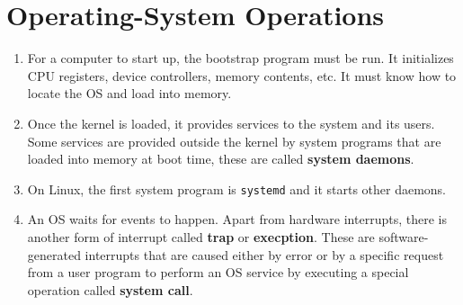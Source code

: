 \documentclass[journal,12pt,twocolumn]{IEEEtran}
\begin{document}
\section{Operating-System Operations}
\begin{enumerate}
  \item For a computer to start up, the bootstrap program must be run. It 
  initializes CPU registers, device controllers, memory contents, etc. It must 
  know how to locate the OS and load into memory.
  \item Once the kernel is loaded, it provides services to the system and its 
  users. Some services are provided outside the kernel by system programs that 
  are loaded into memory at boot time, these are called \textbf{system daemons}.
  \item On Linux, the first system program is \texttt{systemd} and it starts 
  other daemons.
  \item An OS waits for events to happen. Apart from hardware interrupts, there 
  is another form of interrupt called \textbf{trap} or \textbf{execption}. These 
  are software-generated interrupts that are caused either by error or by a 
  specific request from a user program to perform an OS service by executing a 
  special operation called \textbf{system call}.
\end{enumerate}
\end{document}

